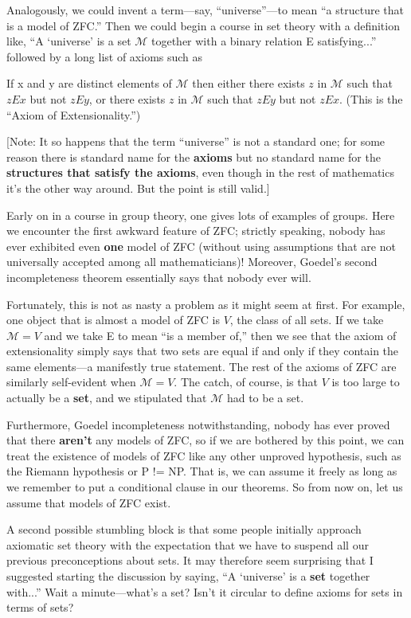\documentclass[10pt]{article}
\newcommand\axiom[1]{\textmd{#1}}
\theoremstyle{definition}
\begin{document}
Analogously, we could invent a term---say, ``universe''---to mean ``a structure that is a model of \axiom{ZFC}.'' Then we could begin a course in set theory with a definition like, ``A `universe' is a set $\mathcal{M}$ together with a binary relation E satisfying...'' followed by a long list of axioms such as

 If x and y are distinct elements of $\mathcal{M}$ then either there
 exists $z$ in $\mathcal{M}$ such that $z E x$ but not $z E y$, or there
 exists $z$ in $\mathcal{M}$ such that $z E y$ but not $z E x$. (This is
 the ``Axiom of Extensionality.'')

[Note: It so happens that the term ``universe'' is not a standard one; for some reason there is standard name for the \textbf{axioms} but no standard name for the \textbf{structures that satisfy the axioms}, even though in the rest of mathematics it's the other way around. But the point is still valid.]

Early on in a course in group theory, one gives lots of examples of groups. Here we encounter the first awkward feature of \axiom{ZFC}; strictly speaking, nobody has ever exhibited even \textbf{one} model of \axiom{ZFC} (without using assumptions that are not universally accepted among all mathematicians)! Moreover, Goedel's second incompleteness theorem essentially says that nobody ever will.

Fortunately, this is not as nasty a problem as it might seem at first. For example, one object that is almost a model of \axiom{ZFC} is $V$, the class of all sets. If we take $\mathcal{M} = V$ and we take E to mean ``is a member of,'' then we see that the axiom of extensionality simply says that two sets are equal if and only if they contain the same elements---a manifestly true statement. The rest of the axioms of \axiom{ZFC} are similarly self-evident when $\mathcal{M} = V$. The catch, of course, is that $V$ is too large to actually be a \textbf{set}, and we stipulated that $\mathcal{M}$ had to be a set.

Furthermore, Goedel incompleteness notwithstanding, nobody has ever proved that there \textbf{aren't} any models of \axiom{ZFC}, so if we are bothered by this point, we can treat the existence of models of \axiom{ZFC} like any other unproved hypothesis, such as the Riemann hypothesis or P != NP. That is, we can assume it freely as long as we remember to put a conditional clause in our theorems. So from now on, let us assume that models of \axiom{ZFC} exist.

A second possible stumbling block is that some people initially approach axiomatic set theory with the expectation that we have to suspend all our previous preconceptions about sets. It may therefore seem surprising that I suggested starting the discussion by saying, ``A `universe' is a \textbf{set} together with...'' Wait a minute---what's a set? Isn't it circular to define axioms for sets in terms of sets?
\end{document}
